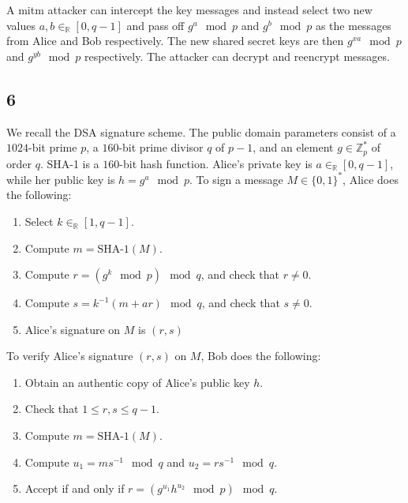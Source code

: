 \documentclass[11pt]{article}
\begin{document}
A mitm attacker can intercept the key messages and instead select two new values $a,b \in_\mathbb{R} [0, q - 1]$ and pass off $g^a \mod p$ and $g^b \mod p$ as the messages from Alice and Bob respectively. The new shared secret keys are then $g^{xa} \mod p$ and $g^{yb} \mod p$ respectively. The attacker can decrypt and reencrypt messages.

\subsection{6} We recall the DSA signature scheme. The public domain parameters consist of a $1024$-bit prime $p$, a $160$-bit prime divisor $q$ of $p - 1$, and an element $g \in \mathbb{Z}^*_p$ of order $q$. SHA-1 is a $160$-bit hash function. Alice's private key is $a \in_\mathbb{R} [0, q - 1]$, while her public key is $h = g^a \mod p$. To sign a message $M \in \{0, 1\}^*$, Alice does the following:

\begin{enumerate}
  \item Select $k \in_\mathbb{R} [1, q - 1]$.

  \item Compute $m = \text{SHA-1}(M)$.

  \item Compute $r = (g^k \mod p) \mod q$, and check that $r \neq 0$.

  \item Compute $s = k^{-1}(m + ar) \mod q$, and check that $s \neq 0$.

  \item Alice's signature on $M$ is $(r, s)$
\end{enumerate}

To verify Alice's signature $(r, s)$ on $M$, Bob does the following:

\begin{enumerate}
  \item Obtain an authentic copy of Alice's public key $h$.

  \item Check that $1 \leq r, s \leq q - 1$.

  \item Compute $m = \text{SHA-1}(M)$.

  \item Compute $u_1 = ms^{-1} \mod q$ and $u_2 = rs^{-1} \mod q$.

  \item Accept if and only if $r = (g^{u_1} h^{u_2} \mod p) \mod q$.
\end{enumerate}
\end{document}
